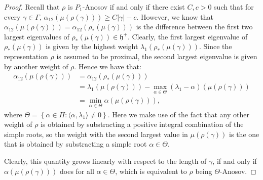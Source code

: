 \documentclass{report}
\begin{document}
\begin{itemize}
\begin{proof}
        Recall that $\rho$ is $P_1$-Anosov if and only if there exist $C, c >0$ such that for every $\gamma \in \Gamma$, $\alpha_{12}(\mu(\rho(\gamma))) \geq C |\gamma| - c$.
        However, we know that $\alpha_{12}(\mu(\rho(\gamma))) = \alpha_{12}(\rho_*(\mu(\gamma)))$ is the difference between the first two largest eigenvalues of $\rho_*(\mu(\gamma)) \in \mathfrak h^+$.
        Clearly, the first largest eigenvalue of $\rho_*(\mu(\gamma))$ is given by the highest weight $\lambda_1(\rho_*(\mu(\gamma)))$.
        Since the representation $\rho$ is assumed to be proximal, the second largest eigenvalue is given by another weight of $\rho$.
        Hence we have that:
        \begin{align*}
            \alpha_{12}(\mu(\rho(\gamma))) &= \alpha_{12}(\rho_*(\mu(\gamma)))\\
            &= \lambda_1(\mu(\rho(\gamma))) - \max_{\alpha \in \Theta} (\lambda_1 - \alpha)(\mu(\rho(\gamma)))\\
            &= \min_{\alpha \in \Theta} \alpha(\mu(\rho(\gamma))),
        \end{align*}
        where $\Theta = \left\{ \alpha \in \Pi: \langle \alpha, \lambda_1 \rangle \neq 0 \right\}$.
        Here we make use of the fact that any other weight of $\rho$ is obtained by substracting a positive integral combination of the simple roots, so the weight with the second largest value in $\mu(\rho(\gamma))$ is the one that is obtained by substracting a simple root $\alpha \in \Theta$.

        Clearly, this quantity grows linearly with respect to the length of $\gamma$, if and only if $\alpha(\mu(\rho(\gamma)))$ does for all $\alpha \in \Theta$, which is equivalent to $\rho$ being $\Theta$-Anosov.
    \end{proof}
\end{itemize}
\end{document}

